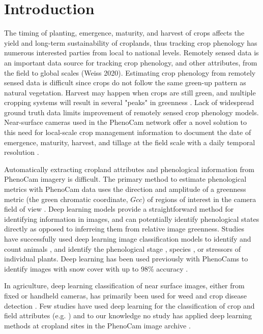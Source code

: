 \documentclass{article}
\begin{document}
\section{Introduction}
The timing of planting, emergence, maturity, and harvest of crops affects the yield and long-term sustainability of croplands, thus tracking crop phenology has numerous interested parties from local to national levels. Remotely sensed data is an important data source for tracking crop phenology, and other attributes, from the field to global scales (Weiss 2020). Estimating crop phenology from remotely sensed data is difficult since crops do not follow the same green-up pattern as natural vegetation. Harvest may happen when crops are still green, and multiple cropping systems will result in several "peaks" in greenness \citep{gao-zhang2021}. Lack of widespread ground truth data limits improvement of remotely sensed crop phenology models. Near-surface cameras used in the PhenoCam network offer a novel solution to this need for local-scale crop management information to document the date of emergence, maturity, harvest, and tillage at the field scale with a daily temporal resolution \citep{hufkens2019}.

Automatically extracting cropland attributes and phenological information from PhenoCam imagery is difficult. The primary method to estimate phenological metrics with PhenoCam data uses the direction and amplitude of a greenness metric (the green chromatic coordinate, $Gcc$) of regions of interest in the camera field of view \citep{richardson2018a, seyednasrollah2019b-scidata}. Deep learning models provide a straightforward method for identifying information in images, and can potentially identify phenological states directly as opposed to inferreing them from relative image greenness. Studies have successfully used deep learning image classification models to identify and count animals \citep{weinstein2018, norouzzadeh2018}, and identify the phenological stage \citep{correia2020}, species \citep{jones2020}, or stressors \citep{ghosal2018} of individual plants. Deep learning has been used previously  with PhenoCams to identify images with snow cover with up to 98\% accuracy \citep{kosmala2016}.

In agriculture, deep learning classification of near surface images, either from fixed or handheld cameras, has primarily been used for weed and crop disease detection \citep{benos2021}. Few studies have used deep learning for the classification of crop and field attributes (e.g. \cite{yalcin2017, han-shi2021}) and to our knowledge no study has applied deep learning methods at cropland sites in the PhenoCam image archive \citep{richardson2019}. 
\end{document}

